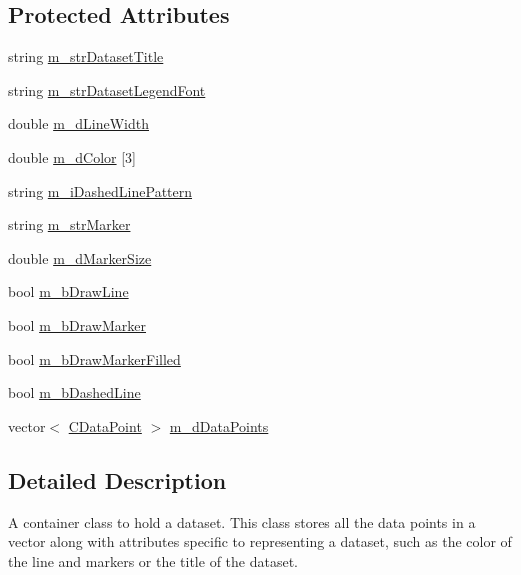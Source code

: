 \subsection*{Protected Attributes}
\begin{DoxyCompactItemize}
\item 
string \hyperlink{class_c_data_set_a02b0ac7182110c68f365190bd4a5a518}{m\-\_\-str\-Dataset\-Title}
\item 
string \hyperlink{class_c_data_set_ab813c1d367d265ae6c333351267722f5}{m\-\_\-str\-Dataset\-Legend\-Font}
\item 
double \hyperlink{class_c_data_set_afc6d30d7f5202542fe346bd4f02d2699}{m\-\_\-d\-Line\-Width}
\item 
double \hyperlink{class_c_data_set_a1f609c3fdd48cd720a5b0dd332fb05f8}{m\-\_\-d\-Color} \mbox{[}3\mbox{]}
\item 
string \hyperlink{class_c_data_set_ad22fc1706abf604a04cc92a42afcb2d9}{m\-\_\-i\-Dashed\-Line\-Pattern}
\item 
string \hyperlink{class_c_data_set_aa02d9ec8b506a501fe7038d49d3b687a}{m\-\_\-str\-Marker}
\item 
double \hyperlink{class_c_data_set_a76de3bd40a039665d8a71164972f5d0b}{m\-\_\-d\-Marker\-Size}
\item 
bool \hyperlink{class_c_data_set_a963836e5f4a29dcd139394107c898b1d}{m\-\_\-b\-Draw\-Line}
\item 
bool \hyperlink{class_c_data_set_a6f90306deeec7d4d564673d3ee45e969}{m\-\_\-b\-Draw\-Marker}
\item 
bool \hyperlink{class_c_data_set_ac235794523914f43b48b2ba13e6395a6}{m\-\_\-b\-Draw\-Marker\-Filled}
\item 
bool \hyperlink{class_c_data_set_a970c9a88bec57e1b2a1e006ea8ae8d93}{m\-\_\-b\-Dashed\-Line}
\item 
vector$<$ \hyperlink{class_c_data_point}{C\-Data\-Point} $>$ \hyperlink{class_c_data_set_ac88fb811a8eab6592b479e425d476ba7}{m\-\_\-d\-Data\-Points}
\end{DoxyCompactItemize}


\subsection{Detailed Description}
A container class to hold a dataset. This class stores all the data points in a vector along with attributes specific to representing a dataset, such as the color of the line and markers or the title of the dataset. 

